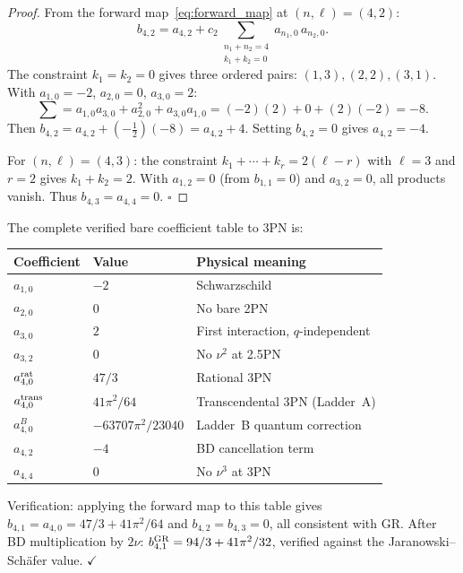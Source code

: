 \documentclass[11pt,a4paper]{article}
\theoremstyle{plain}
\theoremstyle{definition}
\theoremstyle{remark}
\begin{document}
\begin{proof}
From the forward map~\eqref{eq:forward_map} at $(n,\ell) = (4,2)$:
\begin{equation}
  b_{4,2} = a_{4,2} + c_2\!\sum_{\substack{n_1+n_2=4 \\ k_1+k_2=0}}
  a_{n_1,0}\,a_{n_2,0}.
\end{equation}
The constraint $k_1=k_2=0$ gives three ordered pairs: $(1,3),(2,2),(3,1)$.
With $a_{1,0}=-2$, $a_{2,0}=0$, $a_{3,0}=2$:
\begin{equation}
  \sum = a_{1,0}a_{3,0} + a_{2,0}^2 + a_{3,0}a_{1,0}
  = (-2)(2) + 0 + (2)(-2) = -8.
\end{equation}
Then $b_{4,2} = a_{4,2} + (-\tfrac{1}{2})(-8) = a_{4,2} + 4$.
Setting $b_{4,2} = 0$ gives $a_{4,2} = -4$.

For $(n,\ell)=(4,3)$: the constraint $k_1+\cdots+k_r = 2(\ell-r)$ with $\ell=3$
and $r=2$ gives $k_1+k_2=2$. With $a_{1,2}=0$ (from $b_{1,1}=0$) and $a_{3,2}=0$,
all products vanish. Thus $b_{4,3} = a_{4,4} = 0$. \qquad $\square$
\end{proof}

The complete verified bare coefficient table to 3PN is:

\begin{center}
\renewcommand{\arraystretch}{1.4}
\begin{tabular}{llp{7cm}}
\toprule
Coefficient & Value & Physical meaning \\
\midrule
$a_{1,0}$ & $-2$ & Schwarzschild \\
$a_{2,0}$ & $0$ & No bare 2PN \\
$a_{3,0}$ & $2$ & First interaction, $q$-independent \\
$a_{3,2}$ & $0$ & No $\nu^2$ at 2.5PN \\
$a_{4,0}^{\rm rat}$ & $47/3$ & Rational 3PN \\
$a_{4,0}^{\rm trans}$ & $41\pi^2/64$ & Transcendental 3PN (Ladder~A) \\
$a_{4,0}^B$ & $-63707\pi^2/23040$ & Ladder~B quantum correction \\
$a_{4,2}$ & $-4$ & BD cancellation term \\
$a_{4,4}$ & $0$ & No $\nu^3$ at 3PN \\
\bottomrule
\end{tabular}
\end{center}

Verification: applying the forward map to this table gives $b_{4,1} = a_{4,0} =
47/3 + 41\pi^2/64$ and $b_{4,2} = b_{4,3} = 0$, all consistent with GR.
After BD multiplication by $2\nu$: $b_{4,1}^{\rm GR} = 94/3 + 41\pi^2/32$,
verified against the Jaranowski--Sch\"{a}fer value. $\checkmark$
\end{document}

